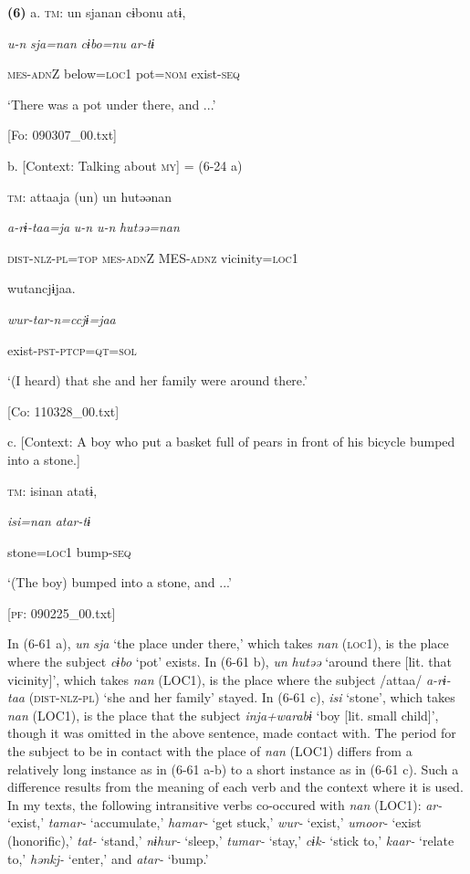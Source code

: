\textbf{(6)}  a.  \textsc{tm}:  un  sjanan  cɨbonu  atɨ,

      \textit{u-n}  \textit{sja=nan}  \textit{cɨbo=nu}  \textit{ar-tɨ}

      \textsc{mes}-\textsc{adn}Z  below=\textsc{loc}1  pot=\textsc{nom}  exist-\textsc{seq}

      ‘There was a pot under there, and ...’

      [Fo: 090307\_00.txt]

  b.  [Context: Talking about \textsc{my}] = (6-24 a)

    \textsc{tm}:  attaaja  (un)  un  hutəənan

      \textit{a-rɨ-taa=ja}  \textit{u-n}  \textit{u-n}  \textit{hutəə=nan}

      \textsc{dist}-\textsc{nlz}-\textsc{pl}=\textsc{top}  \textsc{mes}-\textsc{adn}Z  MES-\textsc{adnz}  vicinity=\textsc{loc}1

      wutancjɨjaa.

      \textit{wur-tar-n=ccjɨ=jaa}

      exist-\textsc{pst}-\textsc{ptcp}=\textsc{qt}=\textsc{sol}

      ‘(I heard) that she and her family were around there.’

      [Co: 110328\_00.txt]

  c.  [Context: A boy who put a basket full of pears in front of his bicycle bumped into a stone.]

    \textsc{tm}:  isinan  atatɨ,

      \textit{isi=nan}  \textit{atar-tɨ}

      stone=\textsc{loc}1  bump-\textsc{seq}

      ‘(The boy) bumped into a stone, and ...’

      [\textsc{pf}: 090225\_00.txt]

In (6-61 a), \textit{un} \textit{sja} ‘the place under there,’ which takes \textit{nan} (\textsc{loc}1), is the place where the subject \textit{cɨbo} ‘pot’ exists. In (6-61 b), \textit{un} \textit{hutəə} ‘around there [lit. that vicinity]’, which takes \textit{nan} (LOC1), is the place where the subject /attaa/ \textit{a-rɨ-taa} (\textsc{dist}-\textsc{nlz}-\textsc{pl}) ‘she and her family’ stayed. In (6-61 c), \textit{isi} ‘stone’, which takes \textit{nan} (LOC1), is the place that the subject \textit{inja+warabɨ} ‘boy [lit. small child]’, though it was omitted in the above sentence, made contact with. The period for the subject to be in contact with the place of \textit{nan} (LOC1) differs from a relatively long instance as in (6-61 a-b) to a short instance as in (6-61 c). Such a difference results from the meaning of each verb and the context where it is used. In my texts, the following intransitive verbs co-occured with \textit{nan} (LOC1): \textit{ar-} ‘exist,’ \textit{tamar-} ‘accumulate,’ \textit{hamar-} ‘get stuck,’ \textit{wur-} ‘exist,’ \textit{umoor-} ‘exist (honorific),’ \textit{tat-} ‘stand,’ \textit{nɨhur-} ‘sleep,’ \textit{tumar-} ‘stay,’ \textit{cɨk-} ‘stick to,’ \textit{kaar-} ‘relate to,’ \textit{hənkj-} ‘enter,’ and \textit{atar-} ‘bump.’

